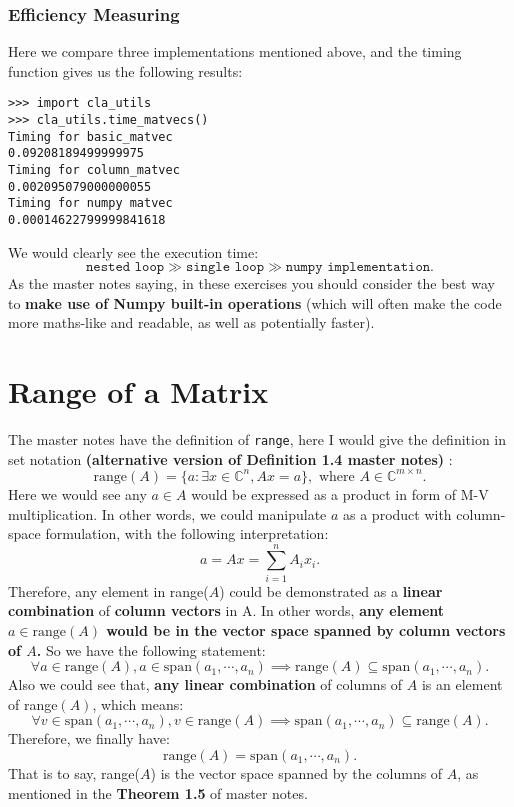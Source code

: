 \subsubsection*{Efficiency Measuring}
Here we compare three implementations mentioned above, and the timing function gives us the following results:
\begin{lstlisting}
>>> import cla_utils
>>> cla_utils.time_matvecs()
Timing for basic_matvec
0.09208189499999975
Timing for column_matvec
0.002095079000000055
Timing for numpy matvec
0.00014622799999841618
\end{lstlisting}
We would clearly see the execution time:
\[
\texttt{nested loop} \gg \texttt{single loop} \gg \texttt{numpy implementation}
.\]
As the master notes saying, in these exercises you should consider the best way to \textbf{make use of Numpy built-in operations} (which will often make the code more maths-like and readable, as well as potentially faster).
\section{Range of a Matrix}%
The master notes have the definition of \texttt{range}, here I would give the definition in set notation \textbf{(alternative version of Definition 1.4 master notes)} :
\[
\text{range}(A) = \{a : \exists x \in \mathbb{C}^{n}, Ax = a \}, \text{ where } A \in \mathbb{C}^{m \times n}
.\]
Here we would see any $a \in A$ would be expressed as a product in form of M-V multiplication. In other words, we could manipulate $a$ as a product with column-space formulation, with the following interpretation:
\[
a = Ax = \sum_{i=1}^{n} A_i x_i
.\]
Therefore, any element in range($A$) could be demonstrated as a \textbf{linear combination} of \textbf{column vectors} in A. In other words, \textbf{any element $a \in \text{range}(A)$ would be in the vector space spanned by column vectors of $A$.} So we have the following statement:
\[
  \forall a \in \text{range}(A), a \in \text{span}(a_1, \cdots, a_n) \implies \text{range}(A) \subseteq \text{span}(a_1, \cdots, a_n)
.\] 
Also we could see that, \textbf{any linear combination} of columns of $A$ is an element of range$(A)$, which means:
\[
  \forall v \in \text{span}(a_1, \cdots, a_n), v \in \text{range}(A) \implies \text{span}(a_1, \cdots, a_n) \subseteq \text{range}(A)
.\] 
Therefore, we finally have:
\[
  \text{range}(A) = \text{span}(a_1, \cdots, a_n)
.\] 
That is to say, range($A$) is the vector space spanned by the columns of $A$, as mentioned in the  \textbf{Theorem 1.5} of master notes. 


